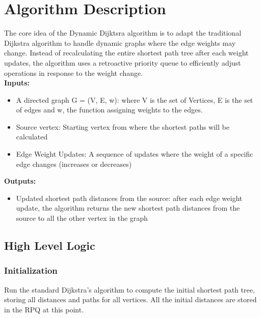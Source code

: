 \documentclass[12pt]{article}
\begin{document}
\section*{Algorithm Description}
The core idea of the Dynamic Dijktsra algorithm is to adapt the traditional Dijkstra algorithm to handle dynamic graphs where the edge weights may change. Instead of recalculating the entire shortest path tree after each weight updates, the algorithm uses a retroactive priority queue to efficiently adjust operations in response to the weight change. \\

\textbf{Inputs:}
\begin{itemize}
    \item A directed graph G = (V, E, w): where V is the set of Vertices, E is the set of edges and w, the function assigning weights to the edges.
    \item Source vertex: Starting vertex from where the shortest paths will be calculated 
    \item Edge Weight Updates: A sequence of updates where the weight of a specific edge changes (increases or decreases)
\end{itemize}

\textbf{Outputs:}
\begin{itemize}
    \item Updated shortest path distances from the source: after each edge weight update, the algorithm returns the new shortest path distances from the source to all the other vertex in the graph

\end{itemize}
\subsection*{High Level Logic}
\subsubsection*{Initialization}
Run the standard Dijkstra’s algorithm to compute the initial shortest path tree, storing all distances and paths for all vertices. All the initial distances are stored in the RPQ at this point.
\end{document}
